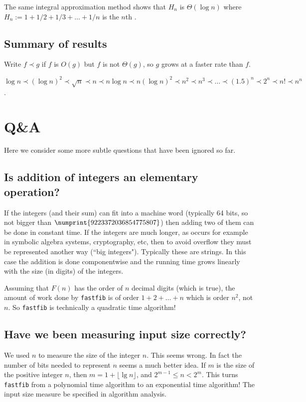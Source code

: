 \begin{Boxample} 
The same integral approximation method shows that $H_n $ is $\Theta(\log n)$ where
$H_n:=1+ 1/2 + 1/3 + \dots + 1/n$ is the $n$th .
\end{Boxample}

\section{Summary of results}
Write $f \prec g$ if $f$ is $O(g)$ but $f$ is not $\Theta(g)$, so $g$ grows at a  faster rate than $f$. 
\begin{Boxample}
$\log n \prec (\log n)^2 \prec \sqrt{n} \prec n \prec n \log n 
 \prec n (\log n)^2 \prec n^2 
\prec n^3 \prec \dots \prec (1.5)^n \prec 2^n \prec n! \prec n^n$.
\end{Boxample}


\chapter{Q\&A} %
Here we consider some more subtle questions that have been ignored so far.

\section{Is addition of integers an elementary operation?}
If the integers (and their sum) can fit into a machine word (typically 64 bits, 
so not bigger than $\numprint{9223372036854775807}$) then 
adding two of them can be done in constant time. 
If the integers are much longer, as occurs for example in symbolic algebra systems, cryptography, etc, 
then to avoid overflow they must be represented another way (``big integers"). Typically these are strings. 
In this case the addition is done componentwise and the running time grows linearly with the size (in digits) of the integers.

\begin{Boxample}
Assuming that $F(n)$ has the order of $n$ decimal digits (which is true), the amount of work 
done by \texttt{fastfib} is of order $1+2+\dots + n$ which is order $n^2$, not $n$. 
So \texttt{fastfib} is technically a quadratic time algorithm!
\end{Boxample}

\section{Have we been measuring input size correctly?}
We used $n$ to measure the size of the integer $n$. This seems wrong. 
In fact the number of bits needed to represent $n$ seems a much better idea. 
If $m$ is the size of the positive integer $n$, then $m = 1+\lfloor\lg n\rfloor$, and $2^{m-1} \leq n < 2^m$.
This turns \texttt{fastfib} from a polynomial time algorithm to an exponential time algorithm! 
The input size measure  be specified in algorithm analysis.

